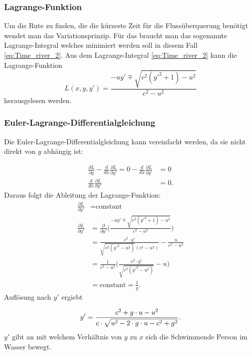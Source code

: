 \subsubsection{Lagrange-Funktion} 
Um die Rute zu finden, die die kürzeste Zeit für die Flussüberquerung benötigt wendet man das Variationsprinzip. Für das braucht man das sogenannte Lagrange-Integral welches minimiert werden soll in diesem Fall \eqref{eq:Time_river_2}. 
Aus dem Lagrange-Integral \eqref{eq:Time_river_2} kann die Lagrange-Funktion
\begin{equation}\label{eq:lagrange_integral}
    L(x, y, y') = \frac{-uy' \mp \sqrt{c^2(y'^2+1)-u^2}}{c^2-u^2}
\end{equation}
herausgelesen werden. 

\subsubsection{Euler-Lagrange-Differentialgleichung} Die Euler-Lagrange-Differentialgleichung kann vereinfacht werden, da sie nicht direkt von \(y\) abhängig ist:

\begin{align}
    \frac{\partial L}{\partial y} - \frac{d}{dx}\frac{\partial L}{\partial y'} = 0 - \frac{d}{dx}\frac{\partial L}{\partial y'} &= 0 \\
    \frac{d}{dx}\frac{\partial L}{\partial y'} &= 0.
\end{align}
Daraus folgt die Ableitung der Lagrange-Funktion:
\begin{align}
    \frac{\partial L}{\partial y'} &= \text{constant} \label{eq:Lagrange_derivites_1}\\
    \frac{\partial L}{\partial y'} &= \frac{\partial}{\partial y'} \biggl (\frac{-uy' \mp \sqrt{c^2(y'^2+1)-u^2}}{c^2-u^2}\biggr) \\
    &= \frac{c^2\cdot y'}{\sqrt{c^2(y'^2-u^2)}(c^2-u^2)} - \frac{u}{c^2-u^2} \\
    &=  \frac{1}{c^2-u^2} \biggl( \frac{c^2\cdot y'}{\sqrt{c^2(y'^2-u^2)}} - u \biggr ) \\
    &= \text{constant} = \frac{1}{g}.\label{eq:Lagrange_derivites_2}
\end{align}
Auflösung nach \(y'\) ergiebt
   
\begin{equation}
    y' = \frac{c^2 + g\cdot u - u^2}{c \cdot \sqrt{u^2-2\cdot g\cdot u - c^2 + g^2}} .\label{eq:angle} \\
\end{equation}
\(y'\) gibt an mit welchem Verhältnis von \(y\) zu \(x\) sich die Schwimmende Person im Wasser bewegt.

































